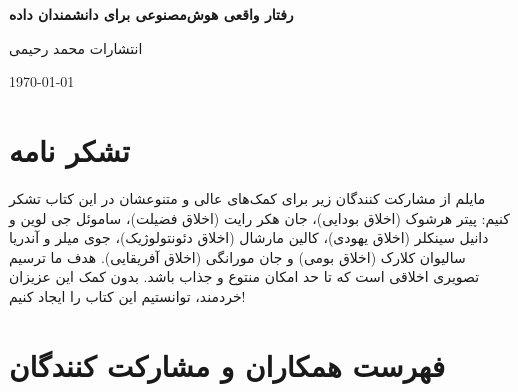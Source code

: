\documentclass[12pt,oneside]{book}
\begin{document}
    \frontmatter

    \begin{titlepage}
        \begin{center}
            \vspace*{1cm}

            {\huge \textbf{رفتار واقعی هوش‌مصنوعی برای دانشمندان داده}}

            \vspace{0.5cm}


            \LARGE انتشارات محمد رحیمی

            \large{\today}

        \end{center}
    \end{titlepage}

    \tableofcontents

    \newpage

    \section*{تشکر نامه}
    \begin{spacing}{1.5}
        مایلم از مشارکت کنندگان زیر برای کمک‌های عالی و متنوعشان در این کتاب تشکر کنیم: پیتر هرشوک (اخلاق بودایی)، جان هکر رایت (اخلاق فضیلت)، ساموئل جی لوین و دانیل سینکلر (اخلاق یهودی)، کالین مارشال (اخلاق دئونتولوژیک)، جوی میلر و آندریا سالیوان کلارک (اخلاق بومی) و جان مورانگی (اخلاق آفریقایی).
        هدف ما ترسیم تصویری اخلاقی است که تا حد امکان منتوع و جذاب باشد.
        بدون کمک این عزیزان خردمند، توانستیم این کتاب را ایجاد کنیم!
    \end{spacing}

    \newpage

    \section*{فهرست همکاران و مشارکت کنندگان}
\end{document}
